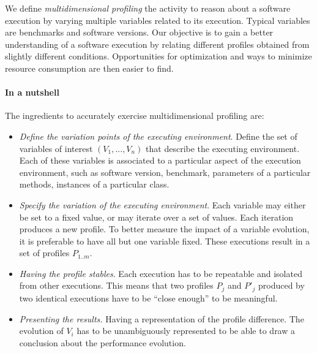 \documentclass[10pt, conference, compsocconf]{IEEEtran}
\newcommand{\ie}{\emph{i.e.,}\xspace}
\begin{document}
We define \emph{multidimensional profiling} the activity to reason about a software execution by varying multiple variables related to its execution. Typical variables are benchmarks and software versions. Our objective is to gain a better understanding of a software execution by relating different profiles obtained from slightly different conditions. Opportunities for optimization and ways to minimize resource consumption are then easier to find.


\paragraph{In a nutshell}
The ingredients to accurately exercise multidimensional profiling are:

\begin{itemize}
\item \emph{Define the variation points of the executing environment}. Define the set of variables of interest $(V_1, ..., V_n)$ that describe the executing environment. Each of these variables is associated to a particular aspect of the execution environment, such as software version, benchmark, parameters of a particular methods, instances of a particular class. 

\item \emph{Specify the variation of the executing environment}. Each variable may either be set to a fixed value, or may iterate over a set of values. Each iteration produces a new profile. To better measure the impact of a variable evolution, it is preferable to have all but one variable fixed. These executions result in a set of profiles $P_{1..m}$. 


\item \emph{Having the profile stables}. Each execution has to be repeatable and isolated from other executions. This means that two profiles $P_j$ and $P'_j$ produced by two identical executions have to be ``close enough'' to be meaningful.

\item \emph{Presenting the results.} Having a representation of the profile difference. The evolution of $V_i$ has to be unambiguously represented to be able to draw a conclusion about the performance evolution.
\end{itemize}
\end{document}
